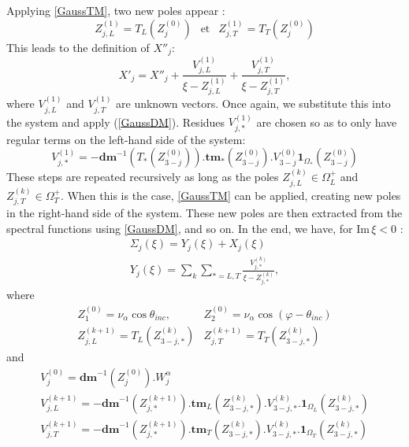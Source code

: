 Applying \eqref{GaussTM}, two new poles appear :
\begin{equation}
Z^{(1)}_{j,L}=T_L(Z_j^{(0)}) \,\;\mbox{ et }\,\; Z^{(1)}_{j,T}=T_T(Z_j^{(0)})
\end{equation}
This leads to the definition of $X''_j$:
\begin{equation}
X'_j=X''_j+\frac{V_{j,L}^{(1)}}{\xi-Z_{j,L}^{(1)}}+\frac{V_{j,T}^{(1)}}{\xi-Z_{j,T}^{(1)}},
\end{equation}
where $V_{j,L}^{(1)}$ and $V_{j,T}^{(1)}$ are unknown vectors. Once again, we substitute this into the system and apply (\ref{GaussDM}). 
Residues $V_{j,*}^{(1)}$ are chosen so as to only have regular terms on the left-hand side of the system:
\begin{equation}
V_{j,*}^{(1)}=-\textbf{dm}^{-1}(T_*(Z_{3-j}^{(0)})).\textbf{tm}_*(Z_{3-j}^{(0)}).V_{3-j}^{(0)}\mathbf{1}_{\Omega_*}(Z_{3-j}^{(0)})
\end{equation}
These steps are repeated recursively as long as the poles $Z_{j,L}^{(k)} \in \Omega_L^+$ and $Z_{j,T}^{(k)} \in \Omega_T^+$. When this is the case, \eqref{GaussTM} can be applied, creating new poles in the right-hand side of the system. These new poles are then extracted from the spectral functions using \eqref{GaussDM}, and so on. In the end, we have, for $\mbox{Im}\, \xi <0$ :
\begin{gather}
\Sigma_j(\xi)=Y_j(\xi)+X_j(\xi) \label{decomp}\\
Y_j(\xi)=\sum_k \sum_{*=L,T} \frac{V_{j,*}^{(k)}}{\xi-Z_{j,*}^{(k)}}
\label{yj},
\end{gather}
where
\begin{equation}
\begin{matrix}
Z_{1}^{(0)}=\nu_{\alpha} \cos \theta_{inc},  & Z_{2}^{(0)}=\nu_{\alpha} \cos(\varphi-\theta_{inc}) \\
Z_{j,L}^{(k+1)}= T_L(Z_{3-j,*}^{(k)}) &Z_{j,T}^{(k+1)}= T_T(Z_{3-j,*}^{(k)}) 
\end{matrix}
\end{equation}
and
\begin{equation}
\begin{matrix}
V_{j}^{(0)}=\textbf{dm}^{-1}(Z_{j}^{(0)}).W_j^{\alpha}\\
V_{j,L}^{(k+1)}=-\textbf{dm}^{-1}(Z_{j,*}^{(k+1)}).\textbf{tm}_L(Z_{3-j,*}^{(k)}).V_{3-j,*}^{(k)}.\textbf{1}_{\Omega_L}(Z_{3-j,*}^{(k)}) \\ 
V_{j,T}^{(k+1)}=-\textbf{dm}^{-1}(Z_{j,*}^{(k+1)}).\textbf{tm}_T(Z_{3-j,*}^{(k)}).V_{3-j,*}^{(k)}.\textbf{1}_{\Omega_T}(Z_{3-j,*}^{(k)}) 
\end{matrix}
\label{residus}
\end{equation}

